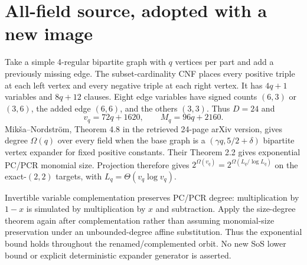 \documentclass[11pt]{article}
\begin{document}
\section{All-field source, adopted with a new image}
Take a simple 4-regular bipartite graph with $q$ vertices per part and add a previously missing edge. The subset-cardinality CNF places every positive triple at each left vertex and every negative triple at each right vertex. It has $4q+1$ variables and $8q+12$ clauses. Eight edge variables have signed counts $(6,3)$ or $(3,6)$, the added edge $(6,6)$, and the others $(3,3)$. Thus $D=24$ and
\[
v_q=72q+1620,\qquad M_q=96q+2160.
\]
Mik\v{s}a--Nordstr\"om, Theorem 4.8 in the retrieved 24-page arXiv version, gives degree $\Omega(q)$ over every field when the base graph is a $(\gamma q,5/2+\delta)$ bipartite vertex expander for fixed positive constants. Their Theorem 2.2 gives exponential PC/PCR monomial size. Projection therefore gives $2^{\Omega(v_q)}=2^{\Omega(L_q/\log L_q)}$ on the exact-$(2,2)$ targets, with $L_q=\Theta(v_q\log v_q)$.

Invertible variable complementation preserves PC/PCR degree: multiplication by $1-x$ is simulated by multiplication by $x$ and subtraction. Apply the size-degree theorem again after complementation rather than assuming monomial-size preservation under an unbounded-degree affine substitution. Thus the exponential bound holds throughout the renamed/complemented orbit. No new SoS lower bound or explicit deterministic expander generator is asserted.
\end{document}

